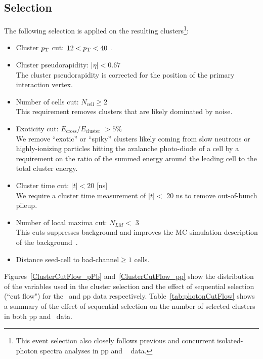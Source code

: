 \subsection{Selection}
The following selection is applied on the resulting clusters\footnote{This event selection also closely follows previous and concurrent isolated-photon spectra analyses in pp and \pPb~ data.}:

\begin{itemize}
\item Cluster $p_{\mathrm{T}}$ cut:  $12< p_{\mathrm{T}} < 40$ \GeVc.
\item Cluster pseudorapidity: $|\eta| <0.67$\\
The cluster pseudorapidity is corrected for the position of the primary interaction vertex. 
\item Number of cells cut: $N_{\mathrm{cell}}\geq2$\\
This requirement removes clusters that are likely dominated by noise. 
\item Exoticity cut: $E_{\mathrm{cross}}/E_{\mathrm{cluster}}$ $> 5\%$\\
We remove ``exotic'' or ``spiky'' clusters likely coming from slow neutrons or highly-ionizing particles hitting the avalanche photo-diode of a cell by a requirement on the ratio of the summed energy around the leading cell to the total cluster energy.
\item Cluster time cut:  $|t|<20$ [ns]\\
We require a cluster time measurement of $|t|<$ 20 ns to remove out-of-bunch pileup. 
\item Number of local maxima cut: $N_{LM}<$ 3\\
This cuts suppresses background and improves the MC simulation description of the background~\cite{Acharya:2019jkx}.  
\item Distance seed-cell to bad-channel$\geq 1$ cells.
\end{itemize}

Figures~\ref{ClusterCutFlow_pPb} and~\ref{ClusterCutFlow_pp} show the distribution of the variables used in the cluster selection and the effect of sequential selection (``cut flow") for the \pPb~and pp data respectively. Table~\ref{tab:photonCutFlow} shows a summary of the effect of sequential selection on the number of selected clusters in both pp and \pPb~data. 

